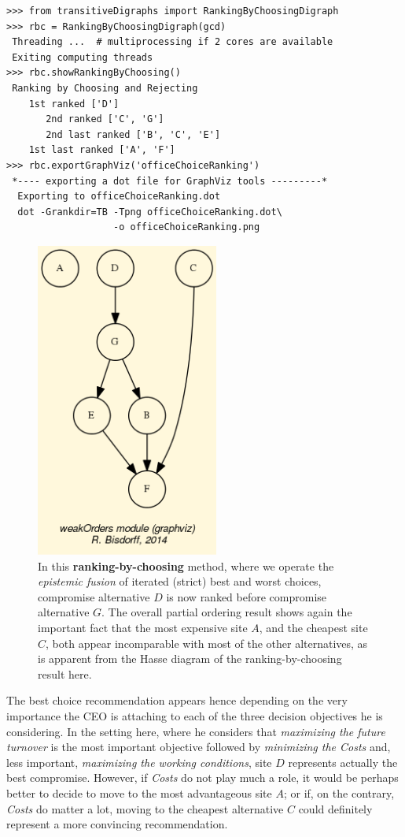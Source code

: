 \begin{lstlisting}
>>> from transitiveDigraphs import RankingByChoosingDigraph
>>> rbc = RankingByChoosingDigraph(gcd)
 Threading ...  # multiprocessing if 2 cores are available
 Exiting computing threads
>>> rbc.showRankingByChoosing()
 Ranking by Choosing and Rejecting
    1st ranked ['D']
       2nd ranked ['C', 'G']
       2nd last ranked ['B', 'C', 'E']
    1st last ranked ['A', 'F']
>>> rbc.exportGraphViz('officeChoiceRanking')
 *---- exporting a dot file for GraphViz tools ---------*
  Exporting to officeChoiceRanking.dot
  dot -Grankdir=TB -Tpng officeChoiceRanking.dot\
                   -o officeChoiceRanking.png
\end{lstlisting}

\begin{figure}[h]
\sidecaption
\includegraphics[width=6cm]{Figures/officeChoiceRanking.png}
\caption{In this \textbf{ranking-by-choosing} method, where we operate the \emph{epistemic fusion} of iterated (strict) best and worst choices, compromise alternative $D$ is now ranked before compromise alternative $G$. The overall partial ordering result shows again the important fact that the most expensive site $A$, and the cheapest site $C$, both appear incomparable with most of the other alternatives, as is apparent from the Hasse diagram of the ranking-by-choosing result here.} 
\label{fig:6.5}       %
\end{figure}
	   
The best choice recommendation appears hence depending on the very importance the CEO is attaching to each of the three decision objectives he is considering. In the setting here, where he considers that \emph{maximizing the future turnover} is the most important objective followed by \emph{minimizing the Costs} and, less important, \emph{maximizing the working conditions}, site $D$ represents actually the best compromise. However, if \emph{Costs} do not play much a role, it would be perhaps better to decide to move to the most advantageous site $A$; or if, on the contrary, \emph{Costs} do matter a lot, moving to the cheapest alternative $C$ could definitely represent a more convincing recommendation. 

